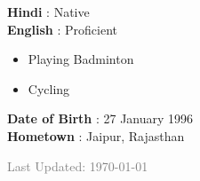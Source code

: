 \documentclass[9pt]{myOwnClass}
\begin{document}
\begin{minipage}[t]{0.25\textwidth}
	\vspace{-\baselineskip}

	
	\textbf{Hindi} \quad\quad: Native\\
	\textbf{English} \quad: Proficient\\

\end{minipage}
\hfill
\begin{minipage}[t]{0.25\textwidth}
	\vspace{-\baselineskip} 
	
	\vspace{-\baselineskip}
	\smallskip
	\renewcommand{\labelitemi}{$\blacksquare$}
	\begin{itemize}
  		\item Playing Badminton
  		\vspace{-\baselineskip}
  		\smallskip
  		\item Cycling
	\end{itemize}
\end{minipage}
\hfill
\begin{minipage}[t]{0.35\textwidth}
	\vspace{-\baselineskip}
	
	
	\textbf{Date of Birth} \quad \hspace{1mm}: 27 January 1996\\
	\textbf{Hometown} \quad\quad: Jaipur, Rajasthan\\[0.5cm]
	
\end{minipage}

\begin{minipage}[t]{1\textwidth}
\begin{flushright}\small\textcolor{gray}{Last Updated: \today}\end{flushright}
\end{minipage}
\end{document}
